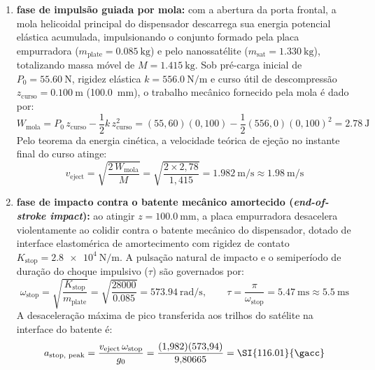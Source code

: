 \begin{enumerate}
  \item \textbf{fase de impulsão guiada por mola:} com a abertura da porta frontal, a mola helicoidal principal do dispensador descarrega sua energia potencial elástica acumulada, impulsionando o conjunto formado pela placa empurradora ($m_{\text{plate}} = \SI{0.085}{\kilo\gram}$) e pelo nanossatélite ($m_{\text{sat}} = \SI{1.330}{\kilo\gram}$), totalizando massa móvel de $M = \SI{1.415}{\kilo\gram}$. Sob pré-carga inicial de $P_0 = \SI{55.60}{\newton}$, rigidez elástica $k = \SI{556.0}{\newton\per\metre}$ e curso útil de descompressão $z_{\text{curso}} = \SI{0.100}{\metre}$ (\SI{100.0}{\milli\metre}), o trabalho mecânico fornecido pela mola é dado por:
  \begin{equation}
    W_{\text{mola}} = P_0 \, z_{\text{curso}} - \frac{1}{2} k \, z_{\text{curso}}^2 = (55{,}60)(0{,}100) - \frac{1}{2}(556{,}0)(0{,}100)^2 = \SI{2.78}{\joule}
    \label{eq:trabalho-mola}
  \end{equation}
  Pelo teorema da energia cinética, a velocidade teórica de ejeção no instante final do curso atinge:
  \begin{equation}
    v_{\text{eject}} = \sqrt{\frac{2\, W_{\text{mola}}}{M}} = \sqrt{\frac{2 \times 2{,}78}{1{,}415}} = \SI{1.982}{\metre\per\second} \approx \SI{1.98}{\metre\per\second}
    \label{eq:vel-ejecao}
  \end{equation}
  
  \item \textbf{fase de impacto contra o batente mecânico amortecido (\textit{end-of-stroke impact}):} ao atingir $z = \SI{100.0}{\milli\metre}$, a placa empurradora desacelera violentamente ao colidir contra o batente mecânico do dispensador, dotado de interface elastomérica de amortecimento com rigidez de contato $K_{\text{stop}} = \SI{2.8e4}{\newton\per\metre}$. A pulsação natural de impacto e o semiperíodo de duração do choque impulsivo ($\tau$) são governados por:
  \begin{equation}
    \omega_{\text{stop}} = \sqrt{\frac{K_{\text{stop}}}{m_{\text{plate}}}} = \sqrt{\frac{\num{28000}}{\num{0.085}}} = \SI{573.94}{\radian\per\second}, \qquad \tau = \frac{\pi}{\omega_{\text{stop}}} = \SI{5.47}{\milli\second} \approx \SI{5.5}{\milli\second}
    \label{eq:impacto-tau}
  \end{equation}
  A desaceleração máxima de pico transferida aos trilhos do satélite na interface do batente é:
  \begin{equation}
    a_{\text{stop, peak}} = \frac{v_{\text{eject}} \, \omega_{\text{stop}}}{g_0} = \frac{(1{,}982)(573{,}94)}{9{,}80665} = \SI{116.01}{\gacc}
    \label{eq:pico-batente}
  \end{equation}
\end{enumerate}

